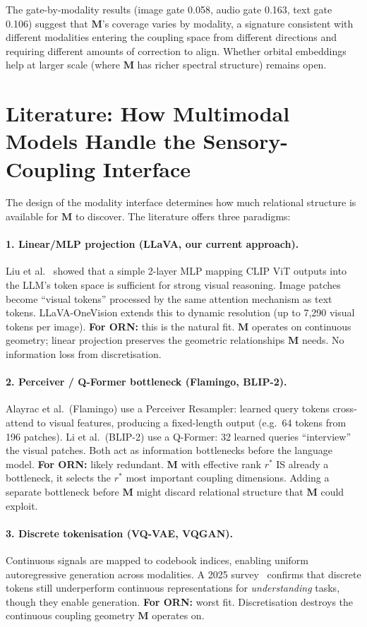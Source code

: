 \documentclass[11pt, a4paper]{article}
\newcommand{\M}{\mathbf{M}}
\theoremstyle{plain}
\theoremstyle{remark}
\begin{document}
The gate-by-modality results (image gate 0.058, audio gate 0.163, text gate 0.106) suggest that $\M$'s coverage varies by modality, a signature consistent with different modalities entering the coupling space from different directions and requiring different amounts of correction to align.  Whether orbital embeddings help at larger scale (where $\M$ has richer spectral structure) remains open.

\section{Literature: How Multimodal Models Handle the Sensory-Coupling Interface}

The design of the modality interface determines how much relational structure is available for $\M$ to discover.
The literature offers three paradigms:

\paragraph{1. Linear/MLP projection (LLaVA, our current approach).}
Liu et al.~\cite{liu2024llava} showed that a simple 2-layer MLP mapping CLIP ViT outputs into the LLM's token space is sufficient for strong visual reasoning.
Image patches become ``visual tokens'' processed by the same attention mechanism as text tokens.
LLaVA-OneVision extends this to dynamic resolution (up to 7{,}290 visual tokens per image).
\textbf{For ORN:} this is the natural fit.
$\M$ operates on continuous geometry; linear projection preserves the geometric relationships $\M$ needs.
No information loss from discretisation.

\paragraph{2. Perceiver / Q-Former bottleneck (Flamingo, BLIP-2).}
Alayrac et al.\ (Flamingo) use a Perceiver Resampler: learned query tokens cross-attend to visual features, producing a fixed-length output (e.g.\ 64 tokens from 196 patches).
Li et al.\ (BLIP-2) use a Q-Former: 32 learned queries ``interview'' the visual patches.
Both act as information bottlenecks before the language model.
\textbf{For ORN:} likely redundant.
$\M$ with effective rank $r^*$ IS already a bottleneck, it selects the $r^*$ most important coupling dimensions.
Adding a separate bottleneck before $\M$ might discard relational structure that $\M$ could exploit.

\paragraph{3. Discrete tokenisation (VQ-VAE, VQGAN).}
Continuous signals are mapped to codebook indices, enabling uniform autoregressive generation across modalities.
A 2025 survey~\cite{discrete2025survey} confirms that discrete tokens still underperform continuous representations for \emph{understanding} tasks, though they enable generation.
\textbf{For ORN:} worst fit.
Discretisation destroys the continuous coupling geometry $\M$ operates on.
\end{document}
